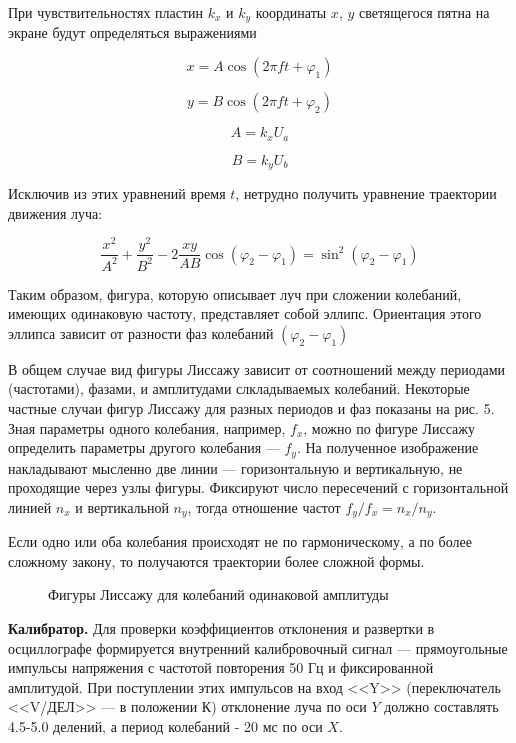 \documentclass[14pt]{article}
\begin{document}
При чувствительностях пластин $k_x$ и $k_y$ координаты $x$, $y$ светящегося пятна на экране будут определяться выражениями

$$x = A\cos (2\pi ft + \varphi_1)$$

$$y = B\cos (2\pi ft + \varphi_2)$$

$$A = k_xU_a$$

$$B = k_yU_b$$

Исключив из этих уравнений время $t$, нетрудно получить уравнение траектории движения луча:

$$\frac{x^2}{A^2} + \frac{y^2}{B^2} - 2\frac{xy}{AB}\cos (\varphi_2 - \varphi_1) = 
  \sin^2 (\varphi_2 - \varphi_1)$$

Таким образом, фигура, которую описывает луч при сложении колебаний, имеющих одинаковую частоту, представляет собой эллипс. Ориентация этого эллипса зависит от разности фаз колебаний $(\varphi_2 - \varphi_1)$

В общем случае вид фигуры Лиссажу зависит от соотношений между периодами (частотами), фазами, и амплитудами слкладываемых колебаний. Некоторые частные случаи фигур Лиссажу для разных периодов и фаз показаны на рис. 5. Зная параметры одного колебания, например, $f_x$, можно по фигуре Лиссажу определить параметры другого колебания --- $f_y$. На полученное изображение накладывают мысленно две линии --- горизонтальную и вертикальную, не проходящие через узлы фигуры. Фиксируют число пересечений с горизонтальной линией $n_x$ и вертикальной $n_y$, тогда отношение частот $f_y/f_x = n_x/n_y$.

Если одно или оба колебания происходят не по гармоническому, а по более сложному закону, то получаются траектории более сложной формы. 

\begin{figure}[h!]
	\caption{Фигуры Лиссажу для колебаний одинаковой амплитуды}
	\label{fig:image}
\end{figure}

%
%

\vspace{0.5cm}
\textbf{Калибратор.} Для проверки коэффициентов отклонения и развертки в осциллографе формируется внутренний калибровочный сигнал --- прямоугольные импульсы напряжения с частотой повторения 50 Гц и фиксированной амплитудой. При поступлении этих импульсов на вход <<Y>> (переключатель <<V/ДЕЛ>> --- в положении К) отклонение луча по оси $Y$ должно составлять 4.5-5.0 делений, а период колебаний - 20 мс по оси $X$.
\end{document}
